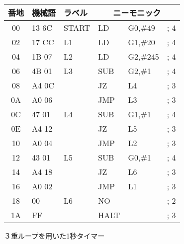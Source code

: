 \begin{figure}[btp]
{\small\tt\begin{center}
\begin{tabular}{|c|l|l|l l l|} \hline
番地 & 機械語 & ラベル & \multicolumn{3}{|c|}{ニーモニック} \\
\hline
00 & 13 6C & START & LD    & G0,\#49        & ; 4    \\
02 & 17 CC & L1    & LD    & G1,\#20        & ; 4    \\
04 & 1B 07 & L2    & LD    & G2,\#245       & ; 4    \\
06 & 4B 01 & L3    & SUB   & G2,\#1         & ; 4    \\
08 & A4 0C &       & JZ    & L4             & ; 3    \\
0A & A0 06 &       & JMP   & L3             & ; 3    \\
0C & 47 01 & L4    & SUB   & G1,\#1         & ; 4    \\
0E & A4 12 &       & JZ    & L5             & ; 3    \\
10 & A0 04 &       & JMP   & L2             & ; 3    \\
12 & 43 01 & L5    & SUB   & G0,\#1         & ; 4    \\
14 & A4 18 &       & JZ    & L6             & ; 3    \\
16 & A0 02 &       & JMP   & L1             & ; 3    \\
18 & 00    & L6    & NO    &                & ; 2    \\
1A & FF    &       & HALT  &                & ; 3    \\
\hline
\end{tabular}
\end{center}}
\caption{３重ループを用いた1秒タイマー}
\label{fig:chap6:loop3}
\end{figure}

\newpage

